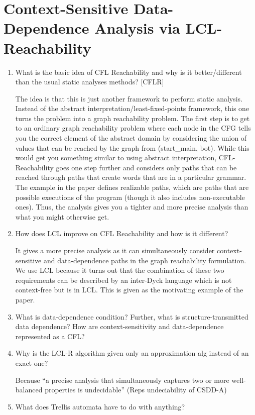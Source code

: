 \documentclass[11pt]{article}
\begin{document}
\section{Context-Sensitive Data-Dependence Analysis via LCL-Reachability}
\begin{enumerate}
  \item What is the basic idea of CFL Reachability and why is it better/different than the usual static analyses methods? [CFLR]

  The idea is that this is just another framework to perform static analysis. Instead of the abstract interpretation/least-fixed-points framework, this one turns the problem into a graph reachability problem. The first step is to get to an ordinary graph reachability problem where each node in the CFG tells you the correct element of the abstract domain by considering the union of values that can be reached by the graph from (start\_main, bot). While this would get you something similar to using abstract interpretation, CFL-Reachability goes one step further and considers only paths that can be reached through paths that create words that are in a particular grammar. The example in the paper defines realizable paths, which are paths that are possible executions of the program (though it also includes non-executable ones). Thus, the analysis gives you a tighter and more precise analysis than what you might otherwise get.
  \item How does LCL improve on CFL Reachability and how is it different?

  It gives a more precise analysis as it can simultaneously consider context-sensitive and data-dependence paths in the graph reachability formulation. We use LCL because it turns out that the combination of these two requirements can be described by an inter-Dyck language which is not context-free but is in LCL. This is given as the motivating example of the paper.

  \item What is data-dependence condition? Further, what is structure-transmitted data dependence? How are context-sensitivity and data-dependence represented as a CFL?
  \item Why is the LCL-R algorithm given only an approximation alg instead of an exact one?

  Because ``a precise analysis that simultaneously captures two or more well-balanced properties is undecidable'' (Reps undeciability of CSDD-A)

  \item What does Trellis automata have to do with anything?


\end{enumerate}
\end{document}
